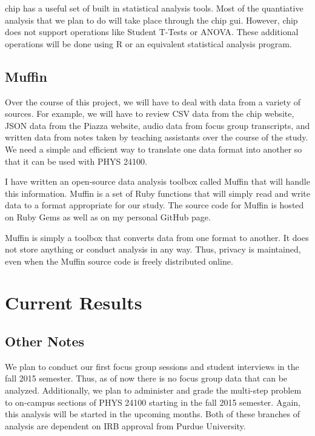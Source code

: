 \gls{chip} has a useful set of built in statistical analysis tools. Most of the quantiative analysis that we plan to do will take place through the \gls{chip} \gls{gui}. However, \gls{chip} does not support operations like Student T-Tests or ANOVA. These additional operations will be done using R or an equivalent statistical analysis program.

\subsection{Muffin}

Over the course of this project, we will have to deal with data from a variety of sources. For example, we will have to review CSV data from the \gls{chip} website, JSON data from the Piazza website, audio data from focus group transcripts, and written data from notes taken by teaching assistants over the course of the study. We need a simple and efficient way to translate one data format into another so that it can be used with PHYS 24100.

I have written an open-source data analysis toolbox called Muffin that will handle this information. Muffin is a set of Ruby functions that will simply read and write data to a format appropriate for our study. The source code for Muffin is hosted on Ruby Gems as well as on my personal GitHub page.

Muffin is simply a toolbox that converts data from one format to another. It does not store anything or conduct analysis in any way. Thus, privacy is maintained, even when the Muffin source code is freely distributed online.

\section{Current Results}

\subsection{Other Notes}

We plan to conduct our first focus group sessions and student interviews in the fall 2015 semester. Thus, as of now there is no focus group data that can be analyzed. Additionally, we plan to administer and grade the multi-step problem to on-campus sections of PHYS 24100 starting in the fall 2015 semester. Again, this analysis will be started in the upcoming months. Both of these branches of analysis are dependent on IRB approval from Purdue University.